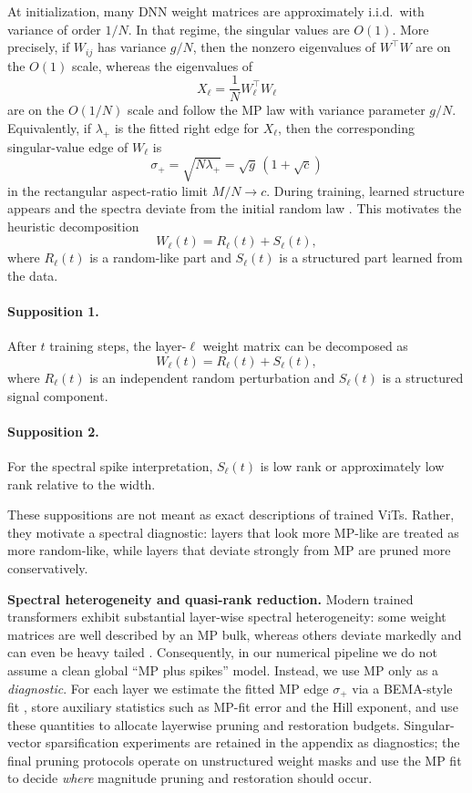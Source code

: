 \documentclass[11pt]{article}
\theoremstyle{plain}
\theoremstyle{definition}
\theoremstyle{remark}
\newcommand{\1}{\mathbf{1}}
\begin{document}
At initialization, many DNN weight matrices are approximately i.i.d.\ with variance of order \(1/N\). In that regime, the singular values are \(O(1)\). More precisely, if \(W_{ij}\) has variance \(g/N\), then the nonzero eigenvalues of \(W^\top W\) are on the \(O(1)\) scale, whereas the eigenvalues of
\[
X_\ell=\frac{1}{N}W_\ell^\top W_\ell
\]
are on the \(O(1/N)\) scale and follow the MP law with variance parameter \(g/N\). Equivalently, if \(\lambda_+\) is the fitted right edge for \(X_\ell\), then the corresponding singular-value edge of \(W_\ell\) is
\[
\sigma_+=\sqrt{N\lambda_+}=\sqrt g\,(1+\sqrt c)
\]
in the rectangular aspect-ratio limit \(M/N\to c\). During training, learned structure appears and the spectra deviate from the initial random law \cite{martin2021implicit,staats2022boundary}. This motivates the heuristic decomposition
\[
W_\ell(t)=R_\ell(t)+S_\ell(t),
\]
where \(R_\ell(t)\) is a random-like part and \(S_\ell(t)\) is a structured part learned from the data.

\paragraph{Supposition 1.}
After \(t\) training steps, the layer-\(\ell\) weight matrix can be decomposed as
\[
W_\ell(t)=R_\ell(t)+S_\ell(t),
\]
where \(R_\ell(t)\) is an independent random perturbation and \(S_\ell(t)\) is a structured signal component.

\paragraph{Supposition 2.}
For the spectral spike interpretation, \(S_\ell(t)\) is low rank or approximately low rank relative to the width.

These suppositions are not meant as exact descriptions of trained ViTs. Rather, they motivate a spectral diagnostic: layers that look more MP-like are treated as more random-like, while layers that deviate strongly from MP are pruned more conservatively.

\noindent\textbf{Spectral heterogeneity and quasi-rank reduction.}
Modern trained transformers exhibit substantial layer-wise spectral heterogeneity: some weight matrices are well described by an MP bulk, whereas others deviate markedly and can even be heavy tailed \cite{martin2021implicit,mahoney2019traditional}. Consequently, in our numerical pipeline we do not assume a clean global ``MP plus spikes'' model. Instead, we use MP only as a \emph{diagnostic}. For each layer we estimate the fitted MP edge \(\sigma_+\) via a BEMA-style fit \cite{ke2021estimation}, store auxiliary statistics such as MP-fit error and the Hill exponent, and use these quantities to allocate layerwise pruning and restoration budgets. Singular-vector sparsification experiments are retained in the appendix as diagnostics; the final pruning protocols operate on unstructured weight masks and use the MP fit to decide \emph{where} magnitude pruning and restoration should occur.
\end{document}
